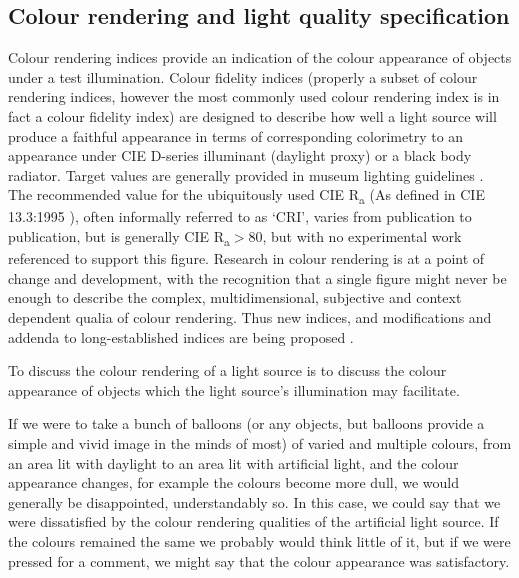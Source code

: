 \subsection{Colour rendering and light quality specification}

Colour rendering indices provide an indication of the colour appearance of objects under a test illumination. Colour fidelity indices (properly a subset of colour rendering indices, however the most commonly used colour rendering index is in fact a colour fidelity index) are designed to describe how well a light source will produce a faithful appearance in terms of corresponding colorimetry to an appearance under \gls{CIE} D-series illuminant (daylight proxy) or a black body radiator. Target values are generally provided in museum lighting guidelines \citep{ies_ies_1996,druzik_guidelines_2012,cibse_lighting_2015,thomson_museum_1986}. The recommended value for the ubiquitously used \gls{CIE} R\textsubscript{a} (As defined in \gls{CIE} 13.3:1995 \citep{cie_cie_1995}), often informally referred to as `CRI', varies from publication to publication, but is generally \gls{CIE} R\textsubscript{a}$>$80, but with no experimental work referenced to support this figure. Research in colour rendering is at a point of change and development, with the recognition that a single figure might never be enough to describe the complex, multidimensional, subjective and context dependent qualia of colour rendering\citep{rea_color_2008}. Thus new indices, and modifications and addenda to long-established indices are being proposed \citep{smet_memory_2012,davis_color_2010,rea_practical_2010,color_metric_task_group_of_the_ies_ies_2015,teunissen_characterising_2016}.

To discuss the colour rendering of a light source is to discuss the colour appearance of objects which the light source's illumination may facilitate. 

If we were to take a bunch of balloons (or any objects, but balloons provide a simple and vivid image in the minds of most) of varied and multiple colours, from an area lit with daylight to an area lit with artificial light, and the colour appearance changes, for example the colours become more dull, we would generally be disappointed, understandably so. In this case, we could say that we were dissatisfied by the colour rendering qualities of the artificial light source. If the colours remained the same we probably would think little of it, but if we were pressed for a comment, we might say that the colour appearance was satisfactory.

